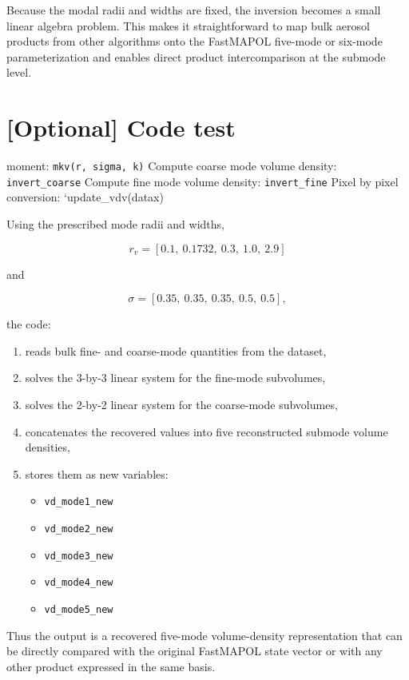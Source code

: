 \documentclass[
  letterpaper,
]{scrbook}
\providecommand{\tightlist}{%
  \setlength{\itemsep}{0pt}\setlength{\parskip}{0pt}}
\begin{document}
Because the modal radii and widths are fixed, the inversion becomes a
small linear algebra problem. This makes it straightforward to map bulk
aerosol products from other algorithms onto the FastMAPOL five-mode or
six-mode parameterization and enables direct product intercomparison at
the submode level.

\section{{[}Optional{]} Code test}\label{optional-code-test}

moment: \texttt{mkv(r,\ sigma,\ k)} Compute coarse mode volume density:
\texttt{invert\_coarse} Compute fine mode volume density:
\texttt{invert\_fine} Pixel by pixel conversion: `update\_vdv(datax)

Using the prescribed mode radii and widths,

\[
r_v = [0.1,\ 0.1732,\ 0.3,\ 1.0,\ 2.9]
\]

and

\[
\sigma = [0.35,\ 0.35,\ 0.35,\ 0.5,\ 0.5],
\]

the code:

\begin{enumerate}
\def\labelenumi{\arabic{enumi}.}
\tightlist
\item
  reads bulk fine- and coarse-mode quantities from the dataset,
\item
  solves the 3-by-3 linear system for the fine-mode subvolumes,
\item
  solves the 2-by-2 linear system for the coarse-mode subvolumes,
\item
  concatenates the recovered values into five reconstructed submode
  volume densities,
\item
  stores them as new variables:

  \begin{itemize}
  \tightlist
  \item
    \texttt{vd\_mode1\_new}
  \item
    \texttt{vd\_mode2\_new}
  \item
    \texttt{vd\_mode3\_new}
  \item
    \texttt{vd\_mode4\_new}
  \item
    \texttt{vd\_mode5\_new}
  \end{itemize}
\end{enumerate}

Thus the output is a recovered five-mode volume-density representation
that can be directly compared with the original FastMAPOL state vector
or with any other product expressed in the same basis.
\end{document}
